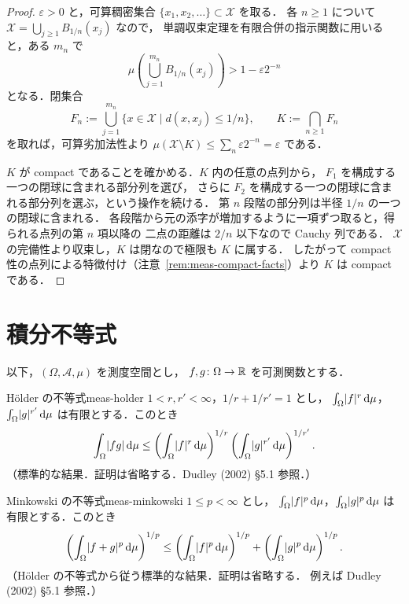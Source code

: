 \begin{proof}
  $\varepsilon>0$ と，可算稠密集合 $\{x_1,x_2,\ldots\}\subset\mathcal{X}$ を取る．
  各 $n\geq1$ について $\mathcal{X}=\bigcup_{j\geq1}B_{1/n}(x_j)$ なので，
  単調収束定理を有限合併の指示関数に用いると，ある $m_n$ で
  \[
    \mu\left(\bigcup_{j=1}^{m_n}B_{1/n}(x_j)\right)>1-\varepsilon2^{-n}
  \]
  となる．閉集合
  \[
    F_n:=\bigcup_{j=1}^{m_n}\{x\in\mathcal{X}\mid d(x,x_j)\leq1/n\},
    \qquad K:=\bigcap_{n\geq1}F_n
  \]
  を取れば，可算劣加法性より $\mu(\mathcal{X}\setminus K)\leq\sum_n\varepsilon2^{-n}=\varepsilon$ である．

  $K$ が compact であることを確かめる．$K$ 内の任意の点列から，
  $F_1$ を構成する一つの閉球に含まれる部分列を選び，
  さらに $F_2$ を構成する一つの閉球に含まれる部分列を選ぶ，という操作を続ける．
  第 $n$ 段階の部分列は半径 $1/n$ の一つの閉球に含まれる．
  各段階から元の添字が増加するように一項ずつ取ると，得られる点列の第 $n$ 項以降の
  二点の距離は $2/n$ 以下なので Cauchy 列である．
  $\mathcal{X}$ の完備性より収束し，$K$ は閉なので極限も $K$ に属する．
  したがって compact 性の点列による特徴付け（注意~\ref{rem:meas-compact-facts}）より $K$ は compact である．
\end{proof}

\section{積分不等式}

以下，$(\Omega,\mathcal{A},\mu)$ を測度空間とし，
$f,g\colon\Omega\to\mathbb{R}$ を可測関数とする．

\begin{theorem}{Hölder の不等式}{meas-holder}
  $1<r,r'<\infty$，$1/r+1/r'=1$ とし，
  $\int_\Omega\lvert f \rvert^r\,\mathrm{d}\mu$，$\int_\Omega\lvert g \rvert^{r'}\,\mathrm{d}\mu$ は有限とする．このとき
  \[
    \int_\Omega\lvert fg \rvert\,\mathrm{d}\mu
    \leq
    \left(\int_\Omega\lvert f \rvert^r\,\mathrm{d}\mu\right)^{1/r}
    \left(\int_\Omega\lvert g \rvert^{r'}\,\mathrm{d}\mu\right)^{1/r'}.
  \]
  （標準的な結果．証明は省略する．Dudley (2002) §5.1 参照．）
\end{theorem}

\begin{theorem}{Minkowski の不等式}{meas-minkowski}
  $1\leq p<\infty$ とし，
  $\int_\Omega\lvert f \rvert^p\,\mathrm{d}\mu$，$\int_\Omega\lvert g \rvert^p\,\mathrm{d}\mu$ は有限とする．このとき
  \[
    \left(\int_\Omega\lvert f+g \rvert^p\,\mathrm{d}\mu\right)^{1/p}
    \leq
    \left(\int_\Omega\lvert f \rvert^p\,\mathrm{d}\mu\right)^{1/p}
    +
    \left(\int_\Omega\lvert g \rvert^p\,\mathrm{d}\mu\right)^{1/p}.
  \]
  （Hölder の不等式から従う標準的な結果．証明は省略する．
  例えば Dudley (2002) §5.1 参照．）
\end{theorem}

